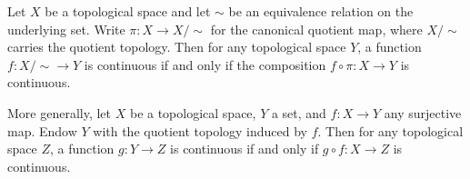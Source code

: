 \begin{proposition} \label{proposition:universal_property_of_quotient_topology}

    Let $X$ be a topological space and let $\sim$ be an equivalence relation on the underlying set. Write $\pi : X \to X/\sim$ for the canonical quotient map, where $X/\sim$ carries the quotient topology. Then for any topological space $Y$, a function $f : X/\sim \to Y$ is continuous if and only if the composition $f \circ \pi : X \to Y$ is continuous.

    More generally, let $X$ be a topological space, $Y$ a set, and $f : X \to Y$ any surjective map. Endow $Y$ with the quotient topology induced by $f$. Then for any topological space $Z$, a function $g : Y \to Z$ is continuous if and only if $g \circ f : X \to Z$ is continuous.
\end{proposition}
